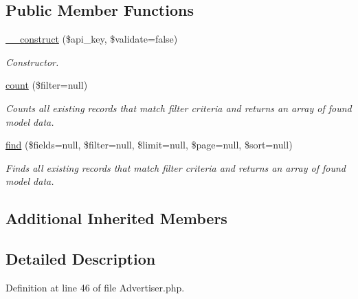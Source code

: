 \subsection*{Public Member Functions}
\begin{DoxyCompactItemize}
\item 
\hyperlink{classTune_1_1Management_1_1Api_1_1Advertiser_ad29063af36a66b7041962c4aa8002d3b}{\-\_\-\-\_\-construct} (\$api\-\_\-key, \$validate=false)
\begin{DoxyCompactList}\small\item\em Constructor. \end{DoxyCompactList}\item 
\hyperlink{classTune_1_1Management_1_1Api_1_1Advertiser_a8b88dd2b30650e6701e132b6074cbc30}{count} (\$filter=null)
\begin{DoxyCompactList}\small\item\em Counts all existing records that match filter criteria and returns an array of found model data. \end{DoxyCompactList}\item 
\hyperlink{classTune_1_1Management_1_1Api_1_1Advertiser_a5349eab046c6cc4f801f1a00dd7068a9}{find} (\$fields=null, \$filter=null, \$limit=null, \$page=null, \$sort=null)
\begin{DoxyCompactList}\small\item\em Finds all existing records that match filter criteria and returns an array of found model data. \end{DoxyCompactList}\end{DoxyCompactItemize}
\subsection*{Additional Inherited Members}


\subsection{Detailed Description}


Definition at line 46 of file Advertiser.\-php.




